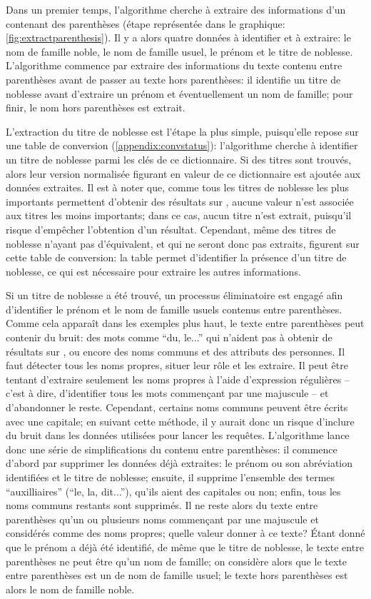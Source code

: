 Dans un premier temps, l'algorithme cherche à extraire des informations d'un \tname{} contenant des parenthèses (étape représentée dans le graphique: \ref{fig:extractparenthesis}). Il y a alors quatre données à identifier et à extraire: le nom de famille noble, le nom de famille usuel, le prénom et le titre de noblesse. L'algorithme commence par extraire des informations du texte contenu entre parenthèses avant de passer au texte hors parenthèses: il identifie un titre de noblesse avant d'extraire un prénom et éventuellement un nom de famille; pour finir, le nom hors parenthèses est extrait.

L'extraction du titre de noblesse est l'étape la plus simple, puisqu'elle repose sur une table de conversion (\ref{appendix:convstatus}): l'algorithme cherche à identifier un titre de noblesse parmi les clés de ce \gls{dictionnaire}. Si des titres sont trouvés, alors leur version normalisée figurant en valeur de ce dictionnaire est ajoutée aux données extraites. Il est à noter que, comme tous les titres de noblesse les plus importants permettent d'obtenir des résultats sur \wkd{}, aucune valeur n'est associée aux titres les moins importants; dans ce cas, aucun titre n'est extrait, puisqu'il risque d'empêcher l'obtention d'un résultat. Cependant, même des titres de noblesse n'ayant pas d'équivalent, et qui ne seront donc pas extraits, figurent sur cette table de conversion: la table permet d'identifier la présence d'un titre de noblesse, ce qui est nécessaire pour extraire les autres informations.

Si un titre de noblesse a été trouvé, un processus éliminatoire est engagé afin d'identifier le prénom et le nom de famille usuels contenus entre parenthèses. Comme cela apparaît dans les exemples plus haut, le texte entre parenthèses peut contenir du bruit: des mots comme \enquote{du, le...} qui n'aident pas à obtenir de résultats sur \wkd{}, ou encore des noms communs et des attributs des personnes. Il faut détecter tous les noms propres, situer leur rôle et les extraire. Il peut être tentant d'extraire seulement les noms propres à l'aide d'\glspl{expression régulière} -- c'est à dire, d'identifier tous les mots commençant par une majuscule -- et d'abandonner le reste. Cependant, certains noms communs peuvent être écrits avec une capitale; en suivant cette méthode, il y aurait donc un risque d'inclure du bruit dans les données utilisées pour lancer les requêtes. L'algorithme lance donc une série de simplifications du contenu entre parenthèses: il commence d'abord par supprimer les données déjà extraites: le prénom ou son abréviation identifiées et le titre de noblesse; ensuite, il supprime l'ensemble des termes \enquote{auxilliaires} (\enquote{le, la, dit...}), qu'ils aient des capitales ou non; enfin, tous les noms communs restants sont supprimés. Il ne reste alors du texte entre parenthèses qu'un ou plusieurs noms commençant par une majuscule et considérés comme des noms propres; quelle valeur donner à ce texte? Étant donné que le prénom a déjà été identifié, de même que le titre de noblesse, le texte entre parenthèses ne peut être qu'un nom de famille; on considère alors que le texte entre parenthèses est un de nom de famille usuel; le texte hors parenthèses est alors le nom de famille noble.

